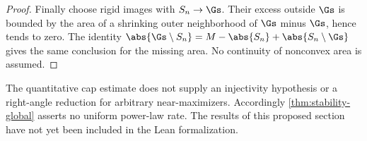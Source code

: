 \begin{proof}
Finally choose rigid images with $S_n\to\Gs$. Their excess outside $\Gs$ is
bounded by the area of a shrinking outer neighborhood of $\Gs$ minus $\Gs$,
hence tends to zero. The identity
$\abs{\Gs\setminus S_n}=M-\abs{S_n}+\abs{S_n\setminus\Gs}$ gives the same
conclusion for the missing area. No continuity of nonconvex area is assumed.
\end{proof}

\begin{remark}
The quantitative cap estimate does not supply an injectivity hypothesis or a
right-angle reduction for arbitrary near-maximizers. Accordingly
\cref{thm:stability-global} asserts no uniform power-law rate. The results of
this proposed section have not yet been included in the Lean formalization.
\end{remark}
